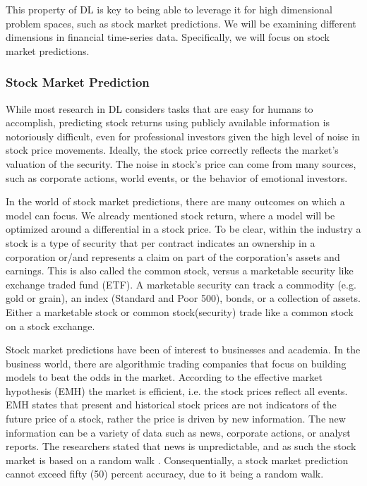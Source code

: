 \documentclass[11pt]{article}
\begin{document}
This property of DL is key to being able to leverage it for high dimensional problem spaces, such as stock market predictions. We will be examining different dimensions in financial time-series data. Specifically, we will focus on stock market predictions.


\subsubsection{Stock Market Prediction}
While most research in DL considers tasks that are easy for humans to accomplish, predicting stock returns using publicly available information is notoriously difficult, even for professional investors given the high level of noise in stock price movements. Ideally, the stock price correctly reflects the market's valuation of the security. The noise in stock's price can come from many sources, such as corporate actions, world events, or the behavior of emotional investors.

In the world of stock market predictions, there are many outcomes on which a model can focus. We already mentioned stock return, where a model will be optimized around a differential in a stock price. To be clear, within the industry a stock is a type of security that per contract indicates an ownership in a corporation or/and represents a claim on part of the corporation's assets and earnings. This is also called the common stock, versus a marketable security like exchange traded fund (ETF). A marketable security can track a commodity (e.g. gold or grain), an index (Standard and Poor 500), bonds, or a collection of assets. Either a marketable stock or common stock(security) trade like a common stock on a stock exchange.

Stock market predictions have been of interest to businesses and academia. In the business world, there are algorithmic trading companies that focus on building models to beat the odds in the market. According to the effective market hypothesis (EMH) \citet{10.2307/2350752,JOFI:JOFI518} the market is efficient, i.e. the stock prices reflect all events. EMH states that present and historical stock prices are not indicators of the future price of a stock, rather the price is driven by new information. The new information can be a variety of data such as news, corporate actions, or analyst reports. The researchers stated that news is unpredictable, and as such the stock market is based on a random walk \cite{doi:10.2469/faj.v51.n1.1861}. Consequentially, a stock market prediction cannot exceed fifty (50) percent accuracy, due to it being a random walk.
\end{document}
